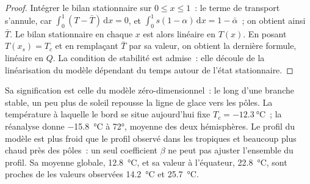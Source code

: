 \begin{proof}
Intégrer le bilan stationnaire sur $0 \le x \le 1$~: le terme de transport
s'annule, car $\int_0^1(T - \bar T)\,\mathrm dx = 0$, et $\int_0^1
s(1 - \alpha)\,\mathrm dx = 1 - \bar\alpha$~; on obtient ainsi $\bar T$. Le
bilan stationnaire en chaque $x$ est alors linéaire en $T(x)$. En posant $T(x_s) = T_c$
et en remplaçant $\bar T$ par sa valeur, on obtient la dernière formule, linéaire en $Q$.
La condition de stabilité est admise~: elle découle de la linéarisation du
modèle dépendant du temps autour de l'état stationnaire.
\end{proof}

Sa signification est celle du modèle zéro-dimensionnel~: le long d'une branche
stable, un peu plus de soleil repousse la ligne de glace vers les pôles. La température à
laquelle le bord se situe aujourd'hui fixe $T_c = \qty{-12.3}{\celsius}$~; la
réanalyse donne \qty{-15.8}{\celsius} à \ang{72}, moyenne des deux
hémisphères. Le profil du modèle est plus froid que le profil observé dans les
tropiques et beaucoup plus chaud près des pôles~: un seul coefficient $\beta$ ne
peut pas ajuster l'ensemble du profil. Sa moyenne globale,
\qty{12.8}{\celsius}, et sa valeur à l'équateur, \qty{22.8}{\celsius}, sont proches de
les valeurs observées \qty{14.2}{\celsius} et \qty{25.7}{\celsius}.

